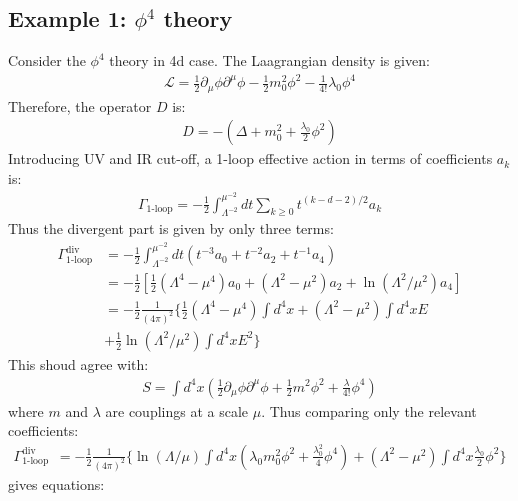 \subsection{Example 1: $\phi ^{4}$ theory}
Consider the $\phi ^{4}$ theory in 4d case. The Laagrangian density is given:
\begin{align}
    \mathcal{L} = \frac{1}{2} \partial_{\mu} \phi \partial ^{\mu} \phi - \frac{1}{2}m_{0}^{2} \phi^{2} -\frac{1}{4!} \lambda _{0} \phi^4
\end{align}
Therefore, the operator $D$ is:
\begin{align}
    D = -(\Delta + m_{0}^{2} + \frac{\lambda_{0}}{2}\phi ^{2})
\end{align}
Introducing UV and IR cut-off, a 1-loop effective action in terms of coefficients $a_{k}$ is:
\begin{align}
    \Gamma _{\text{1-loop}} = -\frac{1}{2} \int _{\Lambda ^{-2}}^{\mu ^{-2}} dt \sum _{k\ge 0} t^{(k-d-2)/2}a_{k} 
\end{align}
Thus the divergent part is given by only three terms:
\begin{align}
    \Gamma_{\text{1-loop}}^{\text{div}} &= -\frac{1}{2}  \int _{\Lambda ^{-2}}^{\mu ^{-2}} dt (t^{-3} a_{0} + t^{-2} a_{2} + t^{-1} a_{4}) \nonumber \\
    & = -\frac{1}{2} [\frac{1}{2} (\Lambda ^{4} -\mu ^{4}) a_{0} + (\Lambda ^{2} - \mu ^{2}) a_{2} + \ln (\Lambda ^{2}/\mu ^{2}) a_{4}] \nonumber \\
    &= -\frac{1}{2} \frac{1}{(4\pi)^{2}} \lbrace \frac{1}{2} (\Lambda ^{4} - \mu ^{4}) \int d^{4}x + (\Lambda ^{2} - \mu ^{2}) \int d^{4}x E \nonumber \\ 
    &+ \frac{1}{2} \ln (\Lambda ^{2} / \mu ^{2}) \int d^{4}x E^{2} \rbrace 
\end{align}
This shoud agree with:
\begin{align}
    S = \int d^{4}x (\frac{1}{2}\partial _{\mu} \phi \partial ^{\mu} \phi + \frac{1}{2} m^{2} \phi ^{2} + \frac{\lambda}{4!}\phi^{4})
\end{align}
where $m$ and $\lambda$ are couplings at a scale $\mu$.
Thus comparing only the relevant coefficients:
\begin{align}
    \Gamma_{\text{1-loop}}^{\text{div}} &= -\frac{1}{2} \frac{1}{(4\pi)^{2}}  \lbrace \ln(\Lambda/\mu) \int d^{4}x (\lambda _{0} m_{0}^{2} \phi^{2} + \frac{\lambda_{0}^{2}}{4} \phi^{4})  + (\Lambda^{2} - \mu ^{2}) \int d^{4}x\frac{\lambda _{0}}{2} \phi^{2} \rbrace
\end{align}
gives equations:
